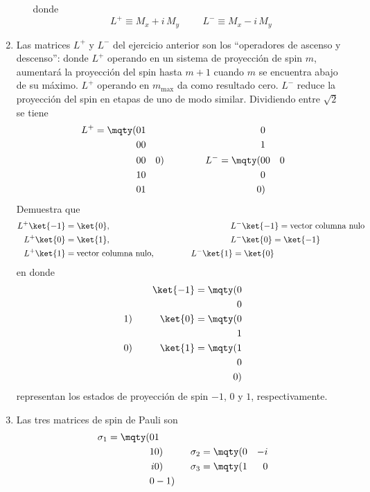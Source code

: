 \begin{enumerate}
\begin{enumerate}
donde 
\[ L^{+} \equiv M_{x} + i \, M_{y} \hspace{1cm} L^{-} \equiv M_{x} - i \, M_{y} \]
\end{enumerate}
\item Las matrices $L^{+}$ y $L^{-}$ del ejercicio anterior son los \enquote{operadores de ascenso y descenso}: donde $L^{+}$ operando en un sistema de proyección de spin $m$, aumentará la proyección del spin hasta $m + 1$ cuando $m$ se encuentra abajo de su máximo. $L^{+}$ operando en $m_{\max}$ da como resultado cero. $L^{-}$ reduce la proyección del spin en etapas de uno de modo similar. Dividiendo entre $\sqrt{2}$ se tiene
\begin{align*}
L^{+} = \mqty(0 & 1 & 0 \\ 0 & 0 & 1 \\ 0 & 0 & 0) \hspace{1.5cm} L^{-} = \mqty(0 & 0 & 0 \\ 1 & 0 & 0 \\ 0 & 1 & 0)
\end{align*}
Demuestra que
\begin{align*}
L^{+} \ket{-1} &= \ket{0}, \hspace{5cm} L^{-} \ket{-1} = \mbox{vector columna nulo} \\
L^{+} \ket{0} &= \ket{1}, \hspace{5cm} L^{-} \ket{0} = \ket{-1} \\
L^{+} \ket{1} &= \mbox{vector columna nulo}, \hspace{1.5cm} L^{-} \ket{1} = \ket{0}
\end{align*}
en donde
\begin{align*}
\ket{-1} = \mqty(0 \\ 0 \\ 1) \hspace{1cm} \ket{0} = \mqty(0 \\ 1 \\ 0) \hspace{1cm} \ket{1} = \mqty(1 \\ 0 \\ 0)
\end{align*}
representan los estados de proyección de spin $-1$, $0$ y $1$, respectivamente.
\item Las tres matrices de spin de Pauli son
\begin{align*}
\sigma_{1} = \mqty(0 & 1 \\ 1 & 0) \hspace{1cm} \sigma_{2} = \mqty(0 & -i \\ i & 0) \hspace{1cm} \sigma_{3} = \mqty(1 & 0 \\ 0 & -1)

\end{align*}
\end{enumerate}
